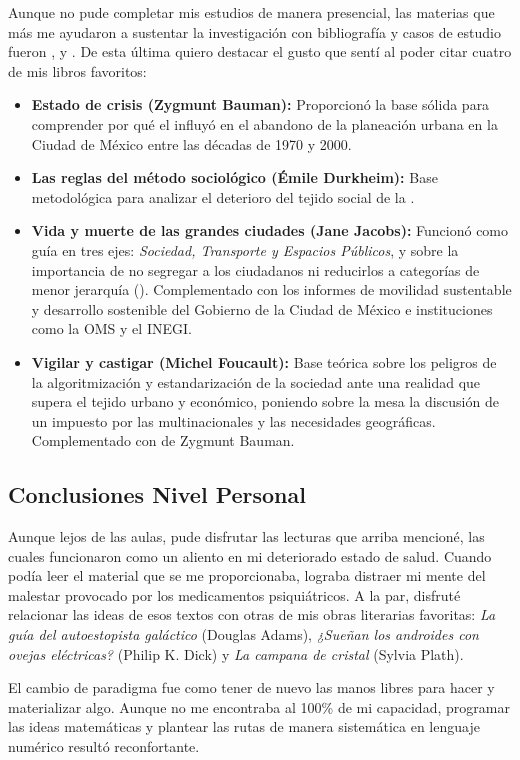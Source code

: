 Aunque no pude completar mis estudios de manera presencial, las materias que más me ayudaron a
sustentar la investigación con bibliografía y casos de estudio fueron ,
 y .
De esta última quiero destacar el gusto que sentí al poder citar cuatro de mis libros favoritos:
\begin{itemize}
    \item \textbf{Estado de crisis (Zygmunt Bauman):} Proporcionó la base sólida para comprender
            por qué el  influyó en el abandono de la planeación urbana
            en la Ciudad de México entre las décadas de 1970 y 2000.
    \item \textbf{Las reglas del método sociológico (Émile Durkheim):} Base metodológica para analizar
            el deterioro del tejido social de la \zmvm.
    \item \textbf{Vida y muerte de las grandes ciudades (Jane Jacobs):} Funcionó como guía en tres ejes:
            \textit{Sociedad, Transporte y Espacios Públicos}, y sobre la importancia de no segregar a
            los ciudadanos ni reducirlos a categorías de menor jerarquía
            ().
            Complementado con los informes de movilidad sustentable y desarrollo sostenible del Gobierno
            de la Ciudad de México e instituciones como la OMS y el INEGI.
    \item \textbf{Vigilar y castigar (Michel Foucault):} Base teórica sobre los peligros de la algoritmización
            y estandarización de la sociedad ante una realidad que supera el tejido urbano y económico, poniendo
            sobre la mesa la discusión de un  impuesto por las multinacionales
            y las necesidades geográficas. Complementado con  de Zygmunt Bauman.
\end{itemize}

\subsection{Conclusiones Nivel Personal}
\label{ssec:conclusiones-nivel-personal}

Aunque lejos de las aulas, pude disfrutar las lecturas que arriba mencioné, las cuales funcionaron
como un aliento en mi deteriorado estado de salud. Cuando podía leer el material que se me proporcionaba,
lograba distraer mi mente del malestar provocado por los medicamentos psiquiátricos. A la par, disfruté
relacionar las ideas de esos textos con otras de mis obras literarias favoritas:
\textit{La guía del autoestopista galáctico} (Douglas Adams),
\textit{¿Sueñan los androides con ovejas eléctricas?} (Philip K. Dick) y
\textit{La campana de cristal} (Sylvia Plath).

El cambio de paradigma fue como tener de nuevo las manos libres para hacer y materializar algo.
Aunque no me encontraba al 100\% de mi capacidad, programar las ideas matemáticas y plantear las
rutas de manera sistemática en lenguaje numérico resultó reconfortante.